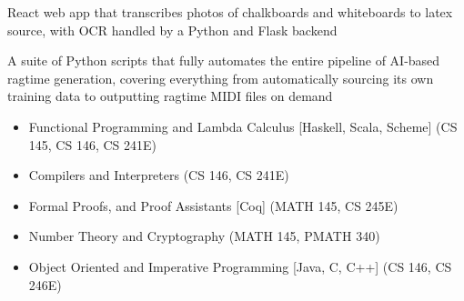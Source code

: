 
\vspace{-0.5em} %
React web app that transcribes photos of chalkboards and whiteboards to latex 
source, with OCR handled by a Python and Flask backend

\divider

\vspace{-0.5em} %
A suite of Python scripts that fully automates the entire pipeline of
AI-based ragtime generation, covering everything from automatically sourcing 
its own training data to outputting ragtime MIDI files on demand



\bigskip

\begin{itemize}
    \item Functional Programming and Lambda Calculus [Haskell, Scala, Scheme] 
        (CS 145, CS 146, CS 241E)
    \item Compilers and Interpreters (CS 146, CS 241E)
    \item Formal Proofs, and Proof Assistants [Coq] (MATH 145, CS 245E)
    \item Number Theory and Cryptography (MATH 145, PMATH 340)
    \item Object Oriented and Imperative Programming [Java, C, C++] (CS 146, CS 246E)
\end{itemize}
\bigskip

